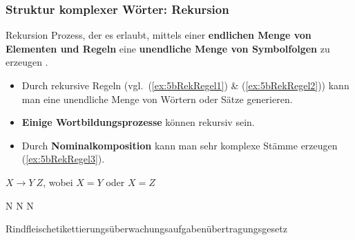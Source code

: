 \begin{frame}
\begin{minipage}{.29\textwidth}
\begin{figure}
\vspace{.5cm}

	\centering
\end{figure}

\end{minipage}

\end{frame}


\begin{frame}
\frametitle{Struktur komplexer Wörter: Rekursion}


\begin{block}{Rekursion}
	Prozess, der es erlaubt, mittels einer \textbf{endlichen Menge von Elementen und Regeln} eine \textbf{unendliche Menge von Symbolfolgen} zu erzeugen \citep[vgl.][]{Hetland14a, Olsen15a}. 
\end{block}

\begin{itemize}
	\item Durch rekursive Regeln (vgl.\ (\ref{ex:5bRekRegel1}) \& (\ref{ex:5bRekRegel2})) kann man eine unendliche Menge von Wörtern oder Sätze generieren.

	\item \textbf{Einige Wortbildungsprozesse} können rekursiv sein.
		
	\item Durch \textbf{Nominalkomposition} kann man sehr komplexe Stämme erzeugen (\ref{ex:5bRekRegel3}).
	
\end{itemize}

\settowidth{} 
\ea 
	\ea\label{ex:5bRekRegel1} $X \rightarrow Y~Z$, wobei $X = Y$ oder $X = Z$ 
	
	\ex\label{ex:5bRekRegel2} N \ras N N 
		
	\ex\label{ex:5bRekRegel3} Rindfleischetikettierungsüberwachungsaufgabenübertragungsgesetz
	\z 
\z 
\end{frame}


